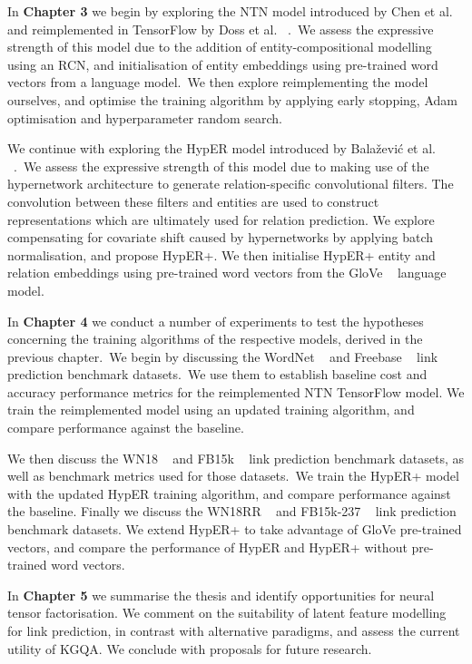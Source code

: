 \noindent In \textbf{Chapter 3} we begin by exploring the NTN model introduced by Chen et al. \unskip ~\citep{socher2013reasoning} and reimplemented in TensorFlow by Doss et al. \unskip ~\citep{Doss2015}.\ We assess the expressive strength of this model due to the addition of entity-compositional modelling using an RCN, and initialisation of entity embeddings using pre-trained word vectors from a language model.\ We then explore reimplementing the model ourselves, and optimise the training algorithm by applying early stopping, Adam optimisation and hyperparameter random search. \par

\noindent We continue with exploring the HypER model introduced by Bala\v{z}evi\'c et al. \unskip ~\citep{balazevic2019hypernetwork}.\ We assess the expressive strength of this model due to making use of the hypernetwork architecture to generate relation-specific convolutional filters. The convolution between these filters and entities are used to construct representations which are ultimately used for relation prediction. We explore compensating for covariate shift caused by hypernetworks by applying batch normalisation, and propose HypER+. We then initialise HypER+ entity and relation embeddings using pre-trained word vectors from the GloVe \unskip~\citep{pennington2014glove} language model. \par

\noindent In \textbf{Chapter 4} we conduct a number of experiments to test the hypotheses concerning the training algorithms of the respective models, derived in the previous chapter.\ We begin by discussing the WordNet \unskip ~\citep{miller1995wordnet} and Freebase \unskip ~\citep{bollacker2008freebase} link prediction benchmark datasets.\ We use them to establish baseline cost and accuracy performance metrics for the reimplemented NTN TensorFlow model. We train the reimplemented model using an updated training algorithm, and compare performance against the baseline. \par

\noindent We then discuss the WN18 \unskip ~\citep{bordes2014semantic} and FB15k \unskip ~\citep{bordes2013translating} link prediction benchmark datasets, as well as benchmark metrics used for those datasets.\ We train the HypER+ model with the updated HypER training algorithm, and compare performance against the baseline. Finally we discuss the WN18RR \unskip ~\citep{dettmers2018convolutional} and FB15k-237 \unskip ~\citep{toutanova2015observed} link prediction benchmark datasets. We extend HypER+ to take advantage of GloVe pre-trained vectors, and compare the performance of HypER and HypER+ without pre-trained word vectors. \par

\noindent In \textbf{Chapter 5} we summarise the thesis and identify opportunities for neural tensor factorisation. We comment on the suitability of latent feature modelling for link prediction, in contrast with alternative paradigms, and assess the current utility of KGQA. We conclude with proposals for future research.

